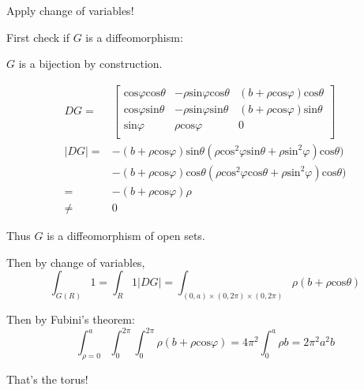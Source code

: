 Apply change of variables!

First check if $G$ is a diffeomorphism:

$G$ is a bijection by construction.

\begin{align*}
DG=&\left[ 
\begin{array}{ccc}
\text{cos}\varphi\text{cos}\theta  & -\rho\text{sin}\varphi\text{cos}\theta & (b+\rho\text{cos}\varphi)\text{cos}\theta\\
\text{cos}\varphi\text{sin}\theta &  -\rho\text{sin}\varphi\text{sin}\theta & (b+\rho\text{cos}\varphi)\text{sin}\theta \\
\text{sin}\varphi & \rho\text{cos}\varphi  &  0\\
\end{array} \right]\\
|DG|=&-(b+\rho\text{cos}\varphi)\text{sin}\theta(\rho\text{cos}^2\varphi\text{sin}\theta+\rho\text{sin}^2\varphi)\text{cos}\theta)\\
&-(b+\rho\text{cos}\varphi)\text{cos}\theta(\rho\text{cos}^2\varphi\text{cos}\theta+\rho\text{sin}^2\varphi)\text{cos}\theta)\\
=&-(b+\rho\text{cos}\varphi)\rho \\
\neq& 0
\end{align*}

Thus $G$ is a diffeomorphism of open sets.

Then by change of variables,
$$\int_{G(R)}1=\int_R1|DG|=\int_{(0,a)\times(0,2\pi)\times(0,2\pi)}\rho(b+\rho\text{cos}\theta)$$

Then by Fubini's theorem:
$$\int^a_{\rho=0}\int_0^{2\pi}\int_0^{2\pi}\rho(b+\rho\text{cos}\varphi)=4\pi^2\int_0^a\rho b=2\pi^2a^2b$$

That's the torus!

